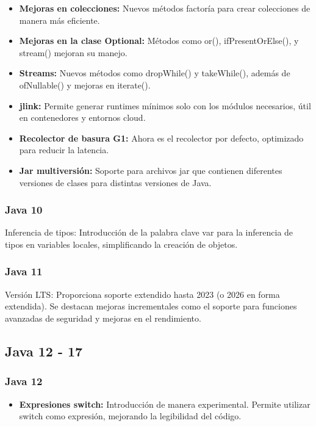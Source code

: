 \begin{center}
\begin{itemize}
		\item  \textbf{Mejoras en colecciones: }Nuevos métodos factoría para crear colecciones de
		      manera más eficiente.

		\item  \textbf{Mejoras en la clase Optional: }Métodos como or(), ifPresentOrElse(), y
		      stream() mejoran su manejo.

		\item  \textbf{Streams: }Nuevos métodos como dropWhile() y takeWhile(), además de
		      ofNullable() y mejoras en iterate().

		\item  \textbf{jlink: }Permite generar runtimes mínimos solo con los módulos necesarios,
		      útil en contenedores y entornos cloud.

		\item  \textbf{Recolector de basura G1: }Ahora es el recolector por defecto, optimizado
		      para reducir la latencia.

		\item  \textbf{Jar multiversión: }Soporte para archivos jar que contienen diferentes
		      versiones de clases para distintas versiones de Java.

	\end{itemize}
	\subsubsection{Java 10}
	Inferencia de tipos: Introducción de la palabra clave var
	para la inferencia de tipos en variables locales, simplificando la creación de objetos.
	\subsubsection{Java 11}
	Versión LTS: Proporciona soporte extendido hasta 2023 (o 2026 en forma extendida).
	Se destacan mejoras incrementales como el soporte para funciones avanzadas de seguridad
	y mejoras en el rendimiento.

	\subsection{Java 12 - 17}
	\subsubsection{Java 12}
	\begin{itemize}
		\item \textbf{Expresiones switch: }Introducción de manera experimental.
		      Permite utilizar switch como expresión, mejorando la legibilidad del código.


\end{itemize}
\end{center}
